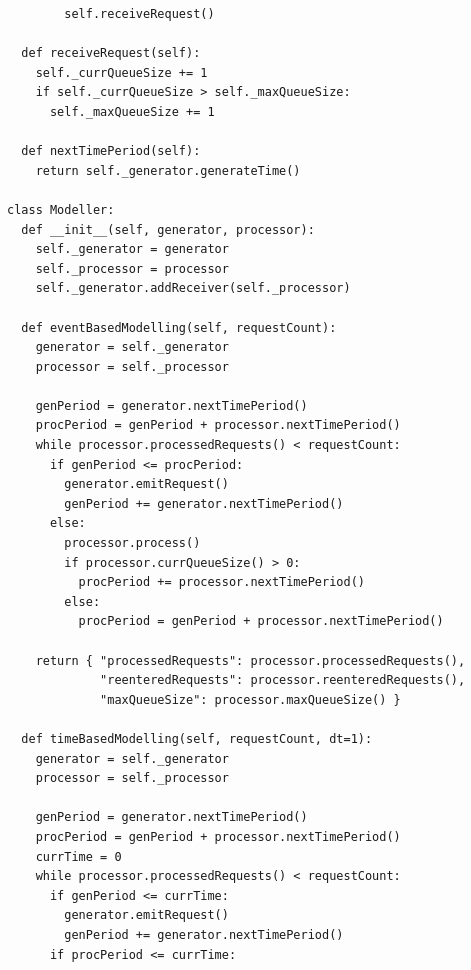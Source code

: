 \documentclass[12pt]{report}
\begin{document}
\begin{lstlisting}
        self.receiveRequest()

  def receiveRequest(self):
    self._currQueueSize += 1
    if self._currQueueSize > self._maxQueueSize:
      self._maxQueueSize += 1

  def nextTimePeriod(self):
    return self._generator.generateTime()

class Modeller:
  def __init__(self, generator, processor):
    self._generator = generator
    self._processor = processor
    self._generator.addReceiver(self._processor)

  def eventBasedModelling(self, requestCount):
    generator = self._generator
    processor = self._processor

    genPeriod = generator.nextTimePeriod()
    procPeriod = genPeriod + processor.nextTimePeriod()
    while processor.processedRequests() < requestCount:
      if genPeriod <= procPeriod:
        generator.emitRequest()
        genPeriod += generator.nextTimePeriod()
      else:
        processor.process()
        if processor.currQueueSize() > 0:
          procPeriod += processor.nextTimePeriod()
        else:
          procPeriod = genPeriod + processor.nextTimePeriod()

    return { "processedRequests": processor.processedRequests(),
             "reenteredRequests": processor.reenteredRequests(),
             "maxQueueSize": processor.maxQueueSize() }

  def timeBasedModelling(self, requestCount, dt=1):
    generator = self._generator
    processor = self._processor

    genPeriod = generator.nextTimePeriod()
    procPeriod = genPeriod + processor.nextTimePeriod()
    currTime = 0
    while processor.processedRequests() < requestCount:
      if genPeriod <= currTime:
        generator.emitRequest()
        genPeriod += generator.nextTimePeriod()
      if procPeriod <= currTime:
\end{lstlisting}
\clearpage
\end{document}
